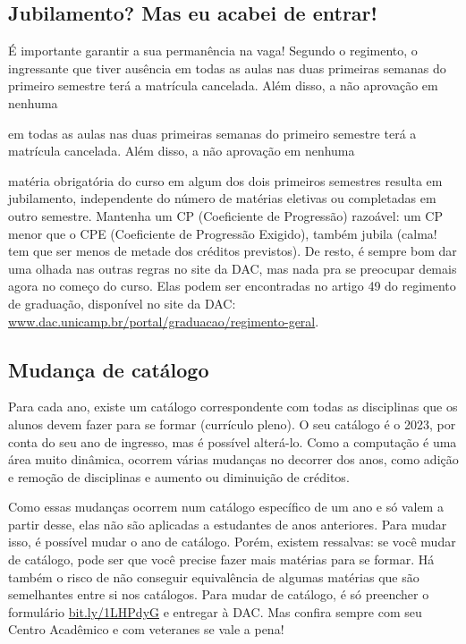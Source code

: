 \subsection{Jubilamento? Mas eu acabei de entrar!}

É importante garantir a sua permanência na vaga! Segundo o regimento, o ingressante que tiver ausência em todas as aulas nas duas primeiras semanas do primeiro semestre terá a matrícula cancelada. Além disso, a não aprovação em nenhuma


em todas as aulas nas duas primeiras semanas do
primeiro semestre terá a matrícula cancelada. Além disso, a não aprovação em nenhuma

matéria obrigatória do curso em algum dos dois primeiros semestres resulta em jubilamento, independente do número de matérias eletivas ou completadas em outro semestre. Mantenha um CP (Coeficiente de Progressão) razoável: um CP menor que o CPE (Coeficiente de Progressão Exigido), também jubila (calma! tem que ser menos de metade dos créditos previstos). De resto, é sempre bom dar uma olhada nas outras regras no site da DAC, mas nada pra se preocupar demais agora no começo do curso. Elas podem ser encontradas no artigo 49 do regimento de graduação, disponível no site da DAC: \url{www.dac.unicamp.br/portal/graduacao/regimento-geral}.

\subsection{Mudança de catálogo}

Para cada ano, existe um catálogo correspondente com todas as disciplinas que os alunos devem fazer para se formar (currículo pleno). O seu catálogo é o 2023, por conta do seu ano de ingresso, mas é possível alterá-lo. Como a computação é uma área muito dinâmica, ocorrem várias mudanças no decorrer dos anos, como adição e remoção de disciplinas e aumento ou diminuição de créditos.

Como essas mudanças ocorrem num catálogo específico de um ano e só valem a partir desse, elas não são aplicadas a estudantes de anos anteriores. Para mudar isso, é possível mudar o ano de catálogo. Porém, existem ressalvas: se você mudar de catálogo, pode ser que você precise fazer mais matérias para se formar. Há também o risco de não conseguir equivalência de algumas matérias que são semelhantes entre si nos catálogos. Para mudar de catálogo, é só preencher o formulário \url{bit.ly/1LHPdyG} e entregar à DAC. Mas confira sempre com seu Centro Acadêmico e com veteranes se vale a pena!

